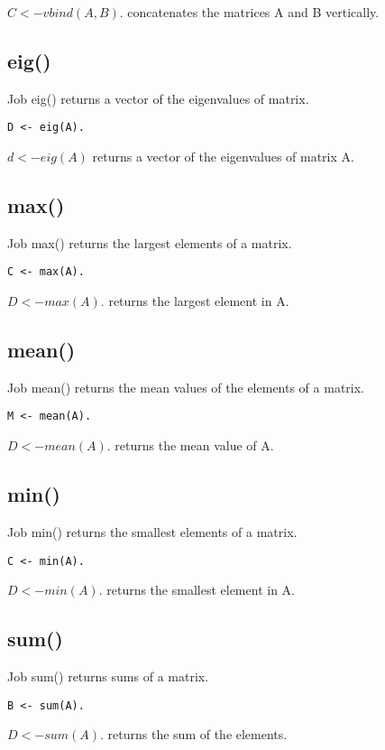 \documentclass[prodmode,acmtecs]{acmsmall}
\begin{document}
$C <- vbind(A,B).$ concatenates the matrices A and B vertically.
\medskip

\subsection{eig()}
Job eig() returns a vector of the eigenvalues of matrix.
\begin{lstlisting}
D <- eig(A).
\end{lstlisting}

$d <- eig(A)$ returns a vector of the eigenvalues of matrix A.
\medskip

\subsection{max()}
Job max() returns the largest elements of a matrix.
\begin{lstlisting}
C <- max(A).
\end{lstlisting}

$D <- max(A).$ returns the largest element in A.
\medskip

\subsection{mean()}
Job mean() returns the mean values of the elements of a matrix.
\begin{lstlisting}
M <- mean(A).
\end{lstlisting}

$D <- mean(A).$ returns the mean value of A.
\medskip

\subsection{min()}
Job min() returns the smallest elements of a matrix.
\begin{lstlisting}
C <- min(A).
\end{lstlisting}

$D <- min(A).$ returns the smallest element in A.
\medskip

\subsection{sum()}
Job sum() returns sums of a matrix.
\begin{lstlisting}
B <- sum(A).
\end{lstlisting}

$D <- sum(A).$ returns the sum of the elements.
\medskip
\end{document}
